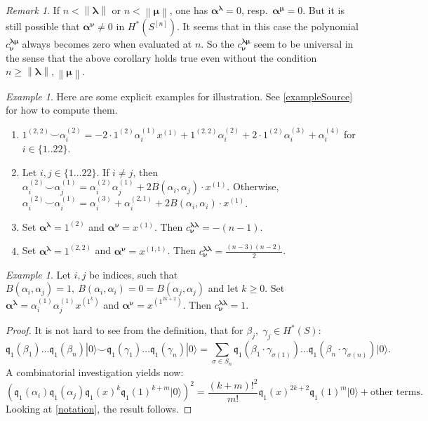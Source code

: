 \documentclass{amsart}
\newcommand{\hilb}[1]{^{[#1]}}
\newcommand{\vac}{|0\rangle}
\newcommand{\One}{1}
\newcommand{\kq}{\mathfrak{q}}
\theoremstyle{plain}
\theoremstyle{definition}
\theoremstyle{remark}
\newtheorem{remark}[theorem]{Remark}
\newtheorem{example}[theorem]{Example}
\begin{document}
\begin{remark}
If $n<\left\|\boldsymbol\lambda\right\|$ or $n<\left\|\boldsymbol\mu\right\| $, one has $\boldsymbol{\alpha}^{\boldsymbol{\lambda}}=0$, resp.~$\boldsymbol{\alpha}^{\boldsymbol{\mu}}=0$. But it is still possible that $\boldsymbol{\alpha}^{\boldsymbol{\nu}}\neq 0$ in $H^*(S\hilb{n})$. It seems that in this case the polynomial $ c^{\boldsymbol{\lambda\mu}}_{\boldsymbol{\nu}}$ always becomes zero when evaluated at $n$. So the $ c^{\boldsymbol{\lambda\mu}}_{\boldsymbol{\nu}}$ seem to be universal in the sense that the above corollary holds true even without the condition $n\geq\left\|\boldsymbol\lambda\right\|,\left\|\boldsymbol\mu\right\| $.
\end{remark}
\begin{example}\label{example} Here are some explicit examples for illustration. See \ref{exampleSource} for how to compute them. 
\begin{enumerate} \item $
\One^{(2,2)}\smile \alpha_i^{(2)} = -2\cdot \One^{(2)}\alpha_i^{(1)}x^{(1)} + \One^{(2,2)}\alpha_i^{(2)} + 2\cdot\One^{(2)}\alpha_i^{(3)} +\alpha_i^{(4)} $ for $i\in\{1..22\}$.
\item Let $i,j\in\{1\ldots 22\}$. 
If $i \neq j$, then $\alpha_i^{(2)}\smile\alpha_j^{(1)} = \alpha_i^{(2)}\alpha_j^{(1)} + 2B(\alpha_i,\alpha_j)\cdot x^{(1)}$. 
Otherwise, $\alpha_i^{(2)}\smile\alpha_i^{(1)} = \alpha_i^{(3)}+ \alpha_i^{(2,1)} + 2B(\alpha_i,\alpha_i)\cdot x^{(1)}$.
\item Set $\boldsymbol{\alpha}^{\boldsymbol{\lambda}} = \One^{(2)}$ and $\boldsymbol{\alpha}^{\boldsymbol{\nu}}=x^{(1)}$. Then $c^{\boldsymbol{\lambda\lambda}}_{\boldsymbol{\nu}} = -(n-1)$.
\item Set $\boldsymbol{\alpha}^{\boldsymbol{\lambda}} = \One^{(2,2)}$ and $\boldsymbol{\alpha}^{\boldsymbol{\nu}}=x^{(1,1)}$. Then $c^{\boldsymbol{\lambda\lambda}}_{\boldsymbol{\nu}} =\frac{(n-3)(n-2)}{2}$.
\end{enumerate}
\end{example}
\begin{example} \label{oddWitness} Let $i,j$ be indices, such that $B(\alpha_i,\alpha_j)=1,\ B(\alpha_i,\alpha_i)=0=B(\alpha_j,\alpha_j)$ and let $k\geq 0$. Set $\boldsymbol{\alpha}^{\boldsymbol{\lambda}} = \alpha_i^{(1)}\alpha_j^{(1)}x^{(1^k)}$ 
and $\boldsymbol{\alpha}^{\boldsymbol{\nu}}= x^{(1^{2k+2})}$. Then $c^{\boldsymbol{\lambda\lambda}}_{\boldsymbol{\nu}} =1$.
\end{example}
\begin{proof}
It is not hard to see from the definition, that for $\beta_j,\;\gamma_j\in H^*(S)$:
$$
\kq_1(\beta_1)\ldots\kq_1(\beta_n)\vac \smile\kq_1(\gamma_1)\ldots\kq_1(\gamma_n)\vac = \sum_{\sigma \in S_n} \kq_1(\beta_1\cdot\gamma_{\sigma(1)})\ldots\kq_1(\beta_n\cdot\gamma_{\sigma(n)})\vac.
$$ 
A combinatorial investigation yields now:
$$
\left(\kq_1(\alpha_i)\kq_1(\alpha_j)\kq_1(x)^k\kq_1(1)^{k+m}\vac \right)^2 = \frac{(k+m)!^2}{m!} \kq_1(x)^{2k+2}\kq_1(1)^m\vac + \text{other terms}.
$$
Looking at \ref{notation}, the result follows.
\end{proof}
\end{document}
